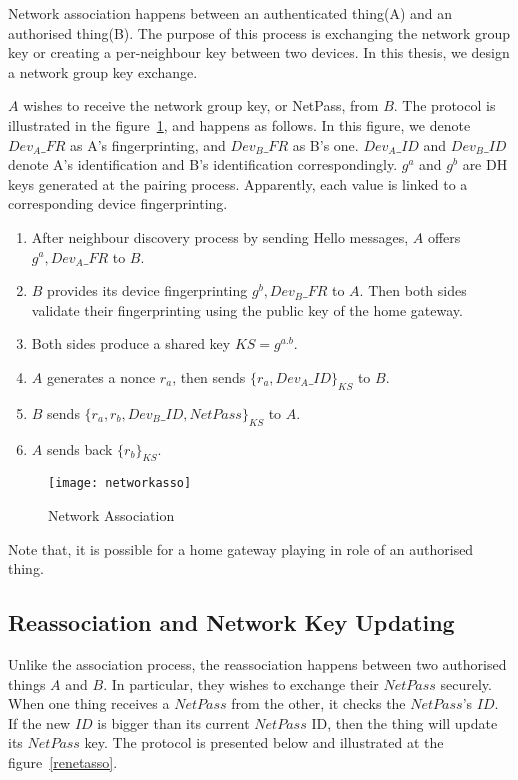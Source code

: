 Network association happens between an authenticated thing(A) and an authorised thing(B). The purpose of this process is exchanging the network group key or creating a per-neighbour key between two devices. In this thesis, we design a network group key exchange.

$A$ wishes to receive the network group key, or NetPass, from $B$. The protocol is illustrated in the figure~\ref{netasso}, and happens as follows. In this figure, we denote $Dev_{A}\_FR$ as A's fingerprinting, and $Dev_{B}\_FR$ as B's one. $Dev_{A}\_ID$ and $Dev_{B}\_ID$ denote A's identification and B's identification correspondingly. $g^a$ and $g^b$ are DH keys generated at the pairing process. Apparently, each value is linked to a corresponding device fingerprinting. 

\begin{enumerate}
\item After neighbour discovery process by sending Hello messages, $A$ offers $g^a, Dev_{A}\_FR$ to $B$. 
\item $B$ provides its device fingerprinting $g^b,Dev_{B}\_FR$ to $A$. Then both sides validate their fingerprinting using the public key of the home gateway. 
\item Both sides produce a shared key $KS = g^{a.b}$. 
\item $A$ generates a nonce $r_a$, then sends $\{r_a, Dev_{A}\_ID\}_{KS}$ to $B$.
\item $B$ sends $\{r_a,r_b,Dev_{B}\_ID, NetPass\}_{KS}$ to $A$. 
\item $A$ sends back $\{r_b\}_{KS}$.
\end{enumerate}

\begin{figure}
  \centering
  \texttt{[image: networkasso]}
  \caption{Network Association}
  \label{netasso}
\end{figure}

Note that, it is possible for a home gateway playing in role of an authorised thing. 

\subsection{Reassociation and Network Key Updating}
 
Unlike the association process, the reassociation happens between two authorised things $A$ and $B$. In particular, they wishes to exchange their $NetPass$ securely. When one thing receives a $NetPass$ from the other, it checks the $NetPass$'s $ID$. If the new $ID$ is bigger than its current $NetPass$ ID, then the thing will update its $NetPass$ key. The protocol is presented below and illustrated at the figure~\ref{renetasso}.

